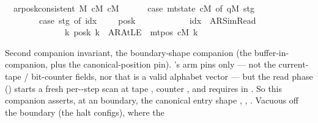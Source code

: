 \begin{isabellebody}
\ \ {\isachardoublequoteopen}ar{\isacharunderscore}{\kern0pt}posk{\isacharunderscore}{\kern0pt}consistent\ M\ cM\ cM{\isacharprime}{\kern0pt}\ {\isasymlongleftrightarrow}\isanewline
\ \ \ \ \ {\isacharparenleft}{\kern0pt}case\ mt{\isacharunderscore}{\kern0pt}state\ cM{\isacharprime}{\kern0pt}\ of\ {\isacharparenleft}{\kern0pt}qM{\isacharprime}{\kern0pt}{\isacharcomma}{\kern0pt}\ stg{\isacharparenright}{\kern0pt}\ {\isasymRightarrow}\isanewline
\ \ \ \ \ \ \ \ {\isacharparenleft}{\kern0pt}case\ stg\ of\ {\isacharparenleft}{\kern0pt}idx{\isacharcomma}{\kern0pt}\ {\isacharunderscore}{\kern0pt}{\isacharcomma}{\kern0pt}\ {\isacharunderscore}{\kern0pt}{\isacharcomma}{\kern0pt}\ {\isacharunderscore}{\kern0pt}{\isacharcomma}{\kern0pt}\ {\isacharunderscore}{\kern0pt}{\isacharcomma}{\kern0pt}\ posk{\isacharparenright}{\kern0pt}\ {\isasymRightarrow}\isanewline
\ \ \ \ \ \ \ \ \ \ \ idx\ {\isacharequal}{\kern0pt}\ AR{\isacharunderscore}{\kern0pt}SimRead\isanewline
\ \ \ \ \ \ \ \ \ \ \ \ \ {\isasymlongrightarrow}\ {\isacharparenleft}{\kern0pt}{\isasymforall}k{\isachardot}{\kern0pt}\ posk\ k\ {\isacharequal}{\kern0pt}\ AR{\isacharunderscore}{\kern0pt}AtLE\ {\isasymlongleftrightarrow}\ mt{\isacharunderscore}{\kern0pt}pos\ cM\ k\ {\isacharequal}{\kern0pt}\ {}{\isacharparenright}{\kern0pt}{\isacharparenright}{\kern0pt}{\isacharparenright}{\kern0pt}{\isachardoublequoteclose}%
\begin{isamarkuptext}%
Second companion invariant, the boundary-shape companion (the
  buffer-in-\isa{{\isasymGamma}} companion, plus
  the canonical-position pin).  's
   arm pins only  — not
  the current-tape / bit-counter fields, nor that  is a
  valid alphabet vector — but the read phase
  () starts a fresh per--step scan
  at tape , counter , and
   requires  in
  .  So this companion asserts, at an
   boundary, the canonical entry shape , , .  Vacuous off the boundary (the halt configs), where the

\end{isamarkuptext}
\end{isabellebody}
